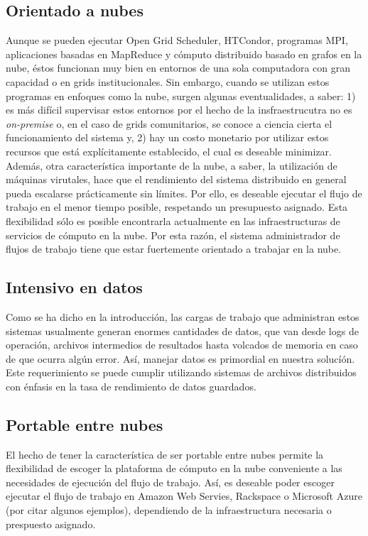 \subsection{Orientado a nubes}

Aunque se pueden ejecutar Open Grid Scheduler, HTCondor, programas MPI, aplicaciones basadas en MapReduce y cómputo distribuido basado en grafos en la nube, éstos funcionan muy bien en entornos de una sola computadora con gran capacidad o en grids institucionales. Sin embargo, cuando se utilizan estos programas en enfoques como la nube, surgen algunas eventualidades, a saber: 1) es más difícil supervisar estos entornos por el hecho de la insfraestrucutra no es \emph{on-premise} o, en el caso de grids comunitarios, se conoce a ciencia cierta el funcionamiento del sistema y, 2) hay un costo monetario por utilizar estos recursos que está explícitamente establecido, el cual es deseable minimizar. Además, otra característica importante de la nube, a saber, la utilización de máquinas virutales, hace que el rendimiento del sistema distribuido en general pueda escalarse prácticamente sin límites. Por ello, es deseable ejecutar el flujo de trabajo en el menor tiempo posible, respetando un presupuesto asignado. Esta flexibilidad sólo es posible encontrarla actualmente en las infraestructuras de servicios de cómputo en la nube. Por esta razón, el sistema administrador de flujos de trabajo tiene que estar fuertemente orientado a trabajar en la nube.



\subsection{Intensivo en datos}

Como se ha dicho en la introducción, las cargas de trabajo que administran estos sistemas usualmente generan enormes cantidades de datos, que van desde logs de operación, archivos intermedios de resultados hasta volcados de memoria en caso de que ocurra algún error. Así, manejar datos es primordial en nuestra solucíón. Este requerimiento se puede cumplir utilizando sistemas de archivos distribuidos con énfasis en la tasa de rendimiento de datos guardados.


\subsection{Portable entre nubes}

El hecho de tener la característica de ser portable entre nubes permite la flexibilidad de escoger la plataforma de cómputo en la nube conveniente a las necesidades de ejecución del flujo de trabajo. Así, es deseable poder escoger ejecutar el flujo de trabajo en Amazon Web Servies, Rackspace o Microsoft Azure (por citar algunos ejemplos), dependiendo de la infraestructura necesaria o prespuesto asignado.


